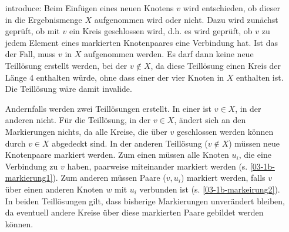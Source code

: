 \begin{itemize}
\item[introduce: ]Beim Einfügen eines neuen Knotens $v$ wird entschieden, ob dieser in die Ergebnismenge $X$ aufgenommen wird oder nicht. Dazu wird zunächst geprüft, ob mit $v$ ein Kreis geschlossen wird, d.h. es wird geprüft, ob $v$ zu jedem Element eines markierten Knotenpaares eine Verbindung hat. Ist das der Fall, muss $v$ in $X$ aufgenommen werden. Es darf dann keine neue Teillösung erstellt werden, bei der $v\notin X$, da diese Teillösung einen Kreis der Länge 4 enthalten würde, ohne dass einer der vier Knoten in $X$ enthalten ist. Die Teillösung wäre damit invalide.

Andernfalls werden zwei Teillösungen erstellt. In einer ist $v\in X$, in der anderen nicht. Für die Teillösung, in der $v\in X$, ändert sich an den Markierungen nichts, da alle Kreise, die über $v$ geschlossen werden können durch $v\in X$ abgedeckt sind. In der anderen Teillösung ($v\notin X$) müssen neue Knotenpaare markiert werden. Zum einen müssen alle Knoten $u_i$, die eine Verbindung zu $v$ haben, paarweise miteinander markiert werden (s. \autoref{03-1b-markierung1}). Zum anderen müssen Paare ($v,u_i$) markiert werden, falls $v$ über einen anderen Knoten $w$ mit $u_i$ verbunden ist (s. \autoref{03-1b-markeirung2}). In beiden Teillösungen gilt, dass bisherige Markierungen unverändert bleiben, da eventuell andere Kreise über diese markierten Paare gebildet werden können.


\end{itemize}
